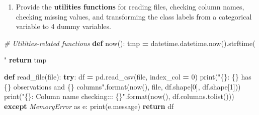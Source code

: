 \documentclass[]{book}
\newenvironment{Shaded}{\begin{snugshade}}{\end{snugshade}}
\newcommand{\KeywordTok}[1]{\textcolor[rgb]{0.13,0.29,0.53}{\textbf{#1}}}
\newcommand{\DecValTok}[1]{\textcolor[rgb]{0.00,0.00,0.81}{#1}}
\newcommand{\SpecialCharTok}[1]{\textcolor[rgb]{0.00,0.00,0.00}{#1}}
\newcommand{\StringTok}[1]{\textcolor[rgb]{0.31,0.60,0.02}{#1}}
\newcommand{\ImportTok}[1]{#1}
\newcommand{\CommentTok}[1]{\textcolor[rgb]{0.56,0.35,0.01}{\textit{#1}}}
\newcommand{\ControlFlowTok}[1]{\textcolor[rgb]{0.13,0.29,0.53}{\textbf{#1}}}
\newcommand{\OperatorTok}[1]{\textcolor[rgb]{0.81,0.36,0.00}{\textbf{#1}}}
\newcommand{\BuiltInTok}[1]{#1}
\newcommand{\PreprocessorTok}[1]{\textcolor[rgb]{0.56,0.35,0.01}{\textit{#1}}}
\newcommand{\NormalTok}[1]{#1}
\providecommand{\tightlist}{%
  \setlength{\itemsep}{0pt}\setlength{\parskip}{0pt}}
\begin{document}
\begin{enumerate}
\def\labelenumi{\arabic{enumi}.}
\setcounter{enumi}{93}
\tightlist
\item
  Provide the \textbf{utilities functions} for reading files, checking column names, checking missing values, and transforming the class labels from a categorical variable to 4 dummy variables.
\end{enumerate}

\begin{Shaded}
\begin{Highlighting}[]
\CommentTok{# Utilities-related functions}
\KeywordTok{def}\NormalTok{ now():}
\NormalTok{    tmp }\OperatorTok{=}\NormalTok{ datetime.datetime.now().strftime(}\StringTok{"%
    \ControlFlowTok{return}\NormalTok{ tmp}

\KeywordTok{def}\NormalTok{ read_file(}\BuiltInTok{file}\NormalTok{):}
    \ControlFlowTok{try}\NormalTok{:}
\NormalTok{        df }\OperatorTok{=}\NormalTok{ pd.read_csv(}\BuiltInTok{file}\NormalTok{, index_col }\OperatorTok{=} \DecValTok{0}\NormalTok{)}
        \BuiltInTok{print}\NormalTok{(}\StringTok{"}\SpecialCharTok{\{\}}\StringTok{: }\SpecialCharTok{\{\}}\StringTok{ has }\SpecialCharTok{\{\}}\StringTok{ observations and }\SpecialCharTok{\{\}}\StringTok{ columns"}\NormalTok{.}\BuiltInTok{format}\NormalTok{(now(), }\BuiltInTok{file}\NormalTok{, df.shape[}\DecValTok{0}\NormalTok{], df.shape[}\DecValTok{1}\NormalTok{]))}
        \BuiltInTok{print}\NormalTok{(}\StringTok{"}\SpecialCharTok{\{\}}\StringTok{: Column name checking::: }\SpecialCharTok{\{\}}\StringTok{"}\NormalTok{.}\BuiltInTok{format}\NormalTok{(now(), df.columns.tolist()))}
    \ControlFlowTok{except} \PreprocessorTok{MemoryError} \ImportTok{as}\NormalTok{ e:}
        \BuiltInTok{print}\NormalTok{(e.message)}
    \ControlFlowTok{return}\NormalTok{ df}

}
\end{Highlighting}
\end{Shaded}
\end{document}
